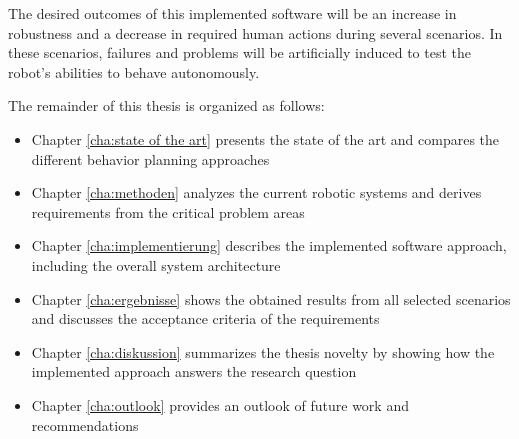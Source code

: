 The desired outcomes of this implemented software will be an increase in robustness and a decrease in required human actions during several scenarios. In these scenarios, failures and problems will be artificially induced to test the robot's abilities to behave autonomously. 

The remainder of this thesis is organized as follows:

\begin{itemize}
	\item Chapter \ref{cha:state of the art} presents the state of the art and compares the different behavior planning approaches
	
	\item Chapter \ref{cha:methoden} analyzes the current robotic systems and derives requirements from the critical problem areas
	
	\item Chapter \ref{cha:implementierung} describes the implemented software approach, including the overall system architecture 
	
	\item Chapter \ref{cha:ergebnisse} shows the obtained results from all selected scenarios and discusses the acceptance criteria of the requirements 
	
	\item Chapter \ref{cha:diskussion} summarizes the thesis novelty by showing how the implemented approach answers the research question
	
	\item Chapter \ref{cha:outlook} provides an outlook of future work and recommendations
\end{itemize}


